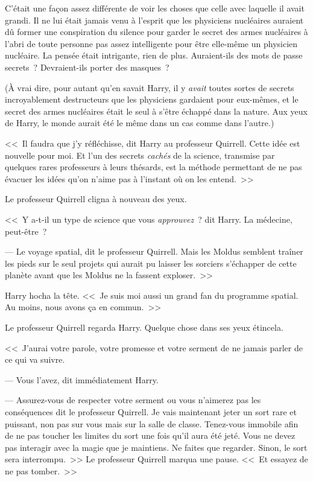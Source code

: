 C'était une façon assez différente de voir les choses que celle avec laquelle il avait grandi. Il ne lui était jamais venu à l'esprit que les physiciens nucléaires auraient dû former une conspiration du silence pour garder le secret des armes nucléaires à l'abri de toute personne pas assez intelligente pour être elle-même un physicien nucléaire. La pensée était intrigante, rien de plus. Auraient-ils des mots de passe secrets~? Devraient-ils porter des masques~?

(À vrai dire, pour autant qu'en savait Harry, il y \emph{avait} toutes sortes de secrets incroyablement destructeurs que les physiciens gardaient pour eux-mêmes, et le secret des armes nucléaires était le seul à s'être échappé dans la nature. Aux yeux de Harry, le monde aurait été le même dans un cas comme dans l'autre.)

<<~Il faudra que j'y réfléchisse, dit Harry au professeur Quirrell. Cette idée est nouvelle pour moi. Et l'un des secrets \emph{cachés} de la science, transmise par quelques rares professeurs à leurs thésards, est la méthode permettant de ne pas évacuer les idées qu'on n'aime pas à l'instant où on les entend.~>>

Le professeur Quirrell cligna à nouveau des yeux.

<<~Y a-t-il un type de science que vous \emph{approuvez}~? dit Harry. La médecine, peut-être~?

--- Le voyage spatial, dit le professeur Quirrell. Mais les Moldus semblent traîner les pieds sur le seul projets qui aurait pu laisser les sorciers s'échapper de cette planète avant que les Moldus ne la fassent exploser.~>>

Harry hocha la tête. <<~Je suis moi aussi un grand fan du programme spatial. Au moins, nous avons ça en commun.~>>

Le professeur Quirrell regarda Harry. Quelque chose dans ses yeux étincela.

<<~J'aurai votre parole, votre promesse et votre serment de ne jamais parler de ce qui va suivre.

--- Vous l'avez, dit immédiatement Harry.

--- Assurez-vous de respecter votre serment ou vous n'aimerez pas les conséquences dit le professeur Quirrell. Je vais maintenant jeter un sort rare et puissant, non pas sur vous mais sur la salle de classe. Tenez-vous immobile afin de ne pas toucher les limites du sort une fois qu'il aura été jeté. Vous ne devez pas interagir avec la magie que je maintiens. Ne faites que regarder. Sinon, le sort sera interrompu.~>> Le professeur Quirrell marqua une pause. <<~Et essayez de ne pas tomber.~>>

